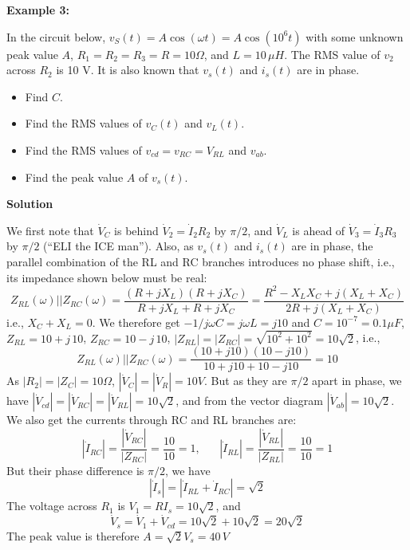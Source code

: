 \documentclass{article}
\begin{document}
{\bf Example 3:} 

In the circuit below, $v_S(t)=A\cos(\omega t)=A\cos(10^6 t)$
with some unknown peak value $A$, $R_1=R_2=R_3=R=10\Omega$, and 
$L=10\,\mu H$. The RMS value of $v_2$ across $R_2$ is 10 V. It 
is also known that $v_s(t)$ and $i_s(t)$ are in phase. 
\begin{itemize}
\item Find $C$.
\item Find the RMS values of $v_C(t)$ and $v_L(t)$.
\item Find the RMS values of $v_{cd}=v_{RC}=V_{RL}$ and $v_{ab}$.
\item Find the peak value $A$ of $v_s(t)$.
\end{itemize}


{\bf Solution} 


We first note that $\dot{V}_C$ is behind $\dot{V}_2=\dot{I}_2R_2$ 
by $\pi/2$, and $\dot{V}_L$ is ahead of $\dot{V}_3=\dot{I}_3R_3$ 
by $\pi/2$ (``ELI the ICE man''). Also, as $v_s(t)$ and $i_s(t)$ 
are in phase, the parallel combination of the RL and RC branches 
introduces no phase shift, i.e., its impedance shown below must be 
real:
\begin{equation}
  Z_{RL}(\omega)||Z_{RC}(\omega)=\frac{(R+jX_L)(R+jX_C)}{R+jX_L+R+jX_C}
  =\frac{R^2-X_LX_C+j(X_L+X_C)}{2R+j(X_L+X_C)}
\end{equation}
i.e., $X_C+X_L=0$. We therefore get $-1/j\omega C=j\omega L=j 10$
and $C=10^{-7}=0.1\mu F$, $Z_{RL}=10+j\,10$, $Z_{RC}=10-j\,10$, 
$|Z_{RL}|=|Z_{RC}|=\sqrt{10^2+10^2}=10\sqrt{2}$, i.e.,
\begin{equation}
  Z_{RL}(\omega)||Z_{RC}(\omega)=\frac{(10+j10)(10-j10)}{10+j10+10-j10}=10
\end{equation}
As $|R_2|=|Z_C|=10 \Omega$, $|\dot{V}_C|=|\dot{V}_R|=10V$.
But as they are $\pi/2$ apart in phase, we have 
$|\dot{V}_{cd}|=|\dot{V}_{RC}|=|\dot{V}_{RL}|=10\sqrt{2}$, and from the
vector diagram $|\dot{V}_{ab}|=10\sqrt{2}$. We also get the currents 
through RC and RL branches are:
\begin{equation}
  |\dot{I}_{RC}|=\frac{|\dot{V}_{RC}|}{|Z_{RC}|}=\frac{10}{10}=1,
  \;\;\;\;\;\;
  |\dot{I}_{RL}|=\frac{|\dot{V}_{RL}|}{|Z_{RL}|}=\frac{10}{10}=1
\end{equation}
But their phase difference is $\pi/2$, we have
\begin{equation}
  |\dot{I}_s|=|\dot{I}_{RL}+\dot{I}_{RC}|=\sqrt{2}
\end{equation}
The voltage across $R_1$ is $V_1=RI_s=10\sqrt{2}$, and
\begin{equation}
  \dot{V}_s=\dot{V}_1+\dot{V}_{cd}=10\sqrt{2}+10\sqrt{2}=20\sqrt{2}
\end{equation}
The peak value is therefore $A=\sqrt{2} V_s=40\,V$
  
\end{document}
